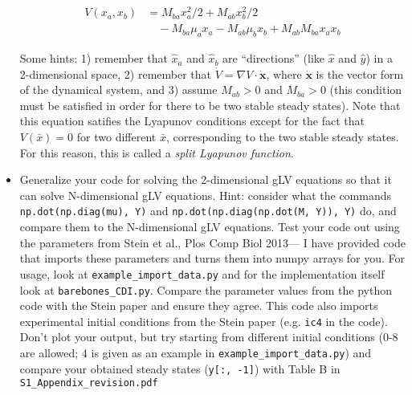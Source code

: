 \documentclass[]{article}
\begin{document}
\begin{itemize}
  \begin{equation}
  \begin{split}
    V(x_a, x_b) &= M_{ba} x_a^2/2 + M_{ab} x_b^2/2 \\ 
    &\quad - M_{ba} \mu_a x_a - M_{ab} \mu_b x_b + M_{ab} M_{ba} x_a x_b
  \end{split}
  \end{equation}

  Some hints: 1) remember that \(\hat{x}_a\) and \(\hat{x}_b\) are
  ``directions'' (like \(\hat{x}\) and \(\hat{y}\)) in a 2-dimensional
  space, 2) remember that \(\dot{V} = \nabla V \cdot \dot{\textbf{x}}\),
  where \(\dot{\textbf{x}}\) is the vector form of the dynamical system,
  and 3) assume \(M_{ab} > 0\) and \(M_{ba} >  0\) (this condition must
  be satisfied in order for there to be two stable steady states). Note
  that this equation satifies the Lyapunov conditions except for the
  fact that \(V(\bar{x}) = 0\) for two different \(\bar{x}\),
  corresponding to the two stable steady states. For this reason, this
  is called a \textit{split Lyapunov function}.
\item
  Generalize your code for solving the 2-dimensional gLV equations so
  that it can solve N-dimensional gLV equations. Hint: consider what the
  commands \texttt{np.dot(np.diag(mu), Y)} and
  \texttt{np.dot(np.diag(np.dot(M, Y)), Y)} do, and compare them to the
  N-dimensional gLV equations. Test your code out using the parameters
  from Stein et al., Plos Comp Biol 2013--- I have provided code that
  imports these parameters and turns them into numpy arrays for you. For
  usage, look at \texttt{example\_import\_data.py} and for the
  implementation itself look at \texttt{barebones\_CDI.py}. Compare the
  parameter values from the python code with the Stein paper and ensure
  they agree. This code also imports experimental initial conditions
  from the Stein paper (e.g. \texttt{ic4} in the code). Don't plot your
  output, but try starting from different initial conditions (0-8 are
  allowed; 4 is given as an example in
  \texttt{example\_import\_data.py}) and compare your obtained steady
  states (\texttt{y[:, -1]}) with Table B in
  \texttt{S1\_Appendix\_revision.pdf}
\end{itemize}
\end{document}
